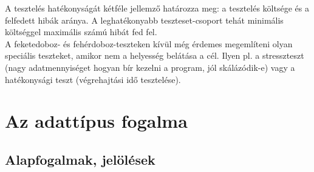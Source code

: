 \documentclass[12pt,margin=0px]{article}
\begin{document}
    \noindent A tesztelés hatékonyságát kétféle jellemző határozza meg: a tesztelés költsége és a felfedett hibák aránya. A leghatékonyabb teszteset-csoport tehát minimális költséggel maximális számú hibát fed fel.\\
	
    \noindent A feketedoboz- és fehérdoboz-teszteken kívül még érdemes megemlíteni olyan speciális teszteket, amikor nem a helyesség belátása a cél. Ilyen pl. a stresszteszt (nagy adatmennyiséget hogyan bír kezelni a program, jól skálázódik-e) vagy a hatékonysági teszt (végrehajtási idő tesztelése).
	
	\section*{Az adattípus fogalma}
	
	\subsection*{Alapfogalmak, jelölések}
	
\end{document}
